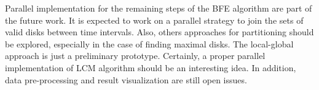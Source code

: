 \documentclass[12pt]{scrartcl}
\begin{document}
Parallel implementation for the remaining steps of the BFE algorithm are part of the future work. It is expected to work on a parallel strategy to join the sets of valid disks between time intervals.  Also, others approaches for partitioning should be explored, especially in the case of finding maximal disks.  The local-global approach is just a preliminary prototype. Certainly, a proper parallel implementation of LCM algorithm should be an interesting idea. In addition, data pre-processing and result visualization are still open issues.



\end{document}
